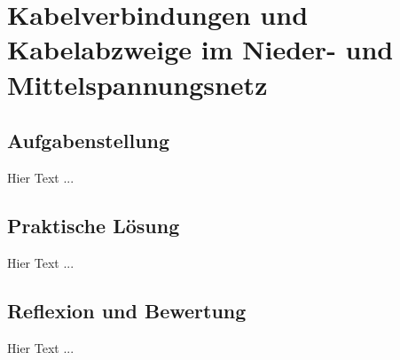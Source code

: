 \chapter{Kabelverbindungen und Kabelabzweige im Nieder- und Mittelspannungsnetz}
\label{cha:Kabelverbindungen}

\section{Aufgabenstellung}

Hier Text ... 

\section{Praktische Lösung}

Hier Text ... 

\section {Reflexion und Bewertung}

Hier Text ... 

\clearpage
